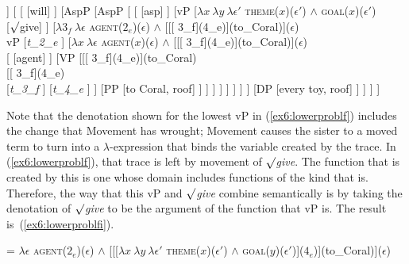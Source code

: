 \begin{fullwidth}
\begin{exe}
\raggedright
	\ex \label{ex6:lowerproblf}
	\small
	\begin{forest}
	[TP
		[DP [she, roof]]
		[ 
			[ [will] ]
			[AspP 
				[AspP [
					[ [asp] ]
					[vP
						[$\lambda x\ \lambda y\ \lambda \epsilon'$ \textsc{theme}($x$)($\epsilon'$) $\wedge$ \textsc{goal}($x$)($\epsilon'$) \\  [$\surd$give] ]
						[$\lambda 3_f\ \lambda \epsilon$ \textsc{agent}($2_e$)($\epsilon$) $\wedge$ {[[[} 3_{f}{]}(4_e){]}(to\_Coral){]}($\epsilon$)\\vP
							[\emph{t_2_e} ]
							[$\lambda x\ \lambda \epsilon$ \textsc{agent}($x$)($\epsilon$) $\wedge$ {[[[} 3_{f}{]}(4_e){]}(to\_Coral){]}($\epsilon$)\\
								[ [agent] ]
								[VP [{[}{[} 3_{f}{]}(4_e){]}(to\_Coral)\\
									[{[} 3_{f}{]}(4_e)\\
										[\emph{t_3_f} ]
										[\emph{t_4_e} ]
									 ]
									[PP [to Coral, roof] ]
								] ]
							 ]
						 ]
					 ]
				] ]
				[DP [every toy, roof] ]
			 ]
		]
	]
	\end{forest}
\end{exe}
\end{fullwidth}
\medskip
Note that the denotation shown for the lowest vP in (\ref{ex6:lowerproblf}) includes the change that Movement has wrought; Movement causes the sister to a moved term to turn into a $\lambda $-expression that binds the variable created by the trace. In (\ref{ex6:lowerproblf}), that trace is left by movement of $\surd$\emph{give}. The function that is created by this is one whose domain includes functions of the kind that  is. Therefore, the way that this vP and $\surd$\emph{give} combine semantically is by taking the denotation of $\surd$\emph{give} to be the argument of the function that vP is. The result is~(\ref{ex6:lowerproblfi}).
\medskip
\begin{fullwidth}
\begin{exe}
\raggedright
	\ex \label{ex6:lowerproblfi}
	 = $\lambda \epsilon$ \textsc{agent}($2_e$)($\epsilon$) $\wedge$ {[[[}$\lambda x\ \lambda y\ \lambda \epsilon'$ \textsc{theme}($x$)($\epsilon'$) $\wedge$ \textsc{goal}($y$)($\epsilon'$){]}($4_e$)](to\_Coral){]}($\epsilon$)
\end{exe}
\end{fullwidth}
